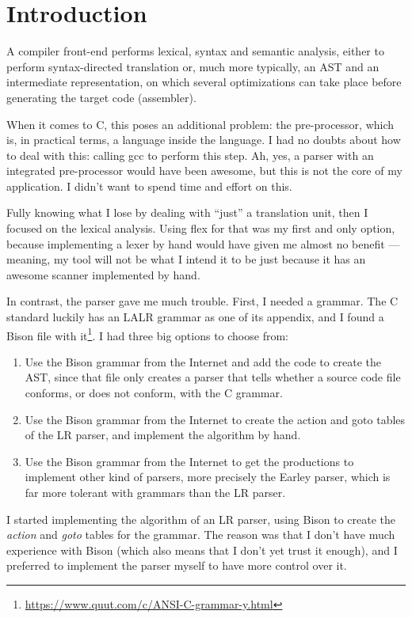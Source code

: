 \documentclass[a4paper,openany]{refrep}
\begin{document}
\section{Introduction}
A compiler front-end performs lexical, syntax and sem\-antic analysis, either to perform syntax-directed translation or, much more typically, an AST and an intermediate representation, on which several optimizations can take place before generating the target code (assembler).

When it comes to C, this poses an additional problem: the pre-processor, which is, in practical terms, a language inside the language. I had no doubts about how to deal with this: calling gcc to perform this step. Ah, yes, a parser with an integrated pre-processor would have been awesome, but this is not the core of my application. I didn't want to spend time and effort on this.

Fully knowing what I lose by dealing with ``just'' a translation unit, then I focused on the lexical analysis. Using flex for that was my first and only option, because implementing a lexer by hand would have given me almost no benefit --- meaning, my tool will not be what I intend it to be just because it has an awesome scanner implemented by hand.

In contrast, the parser gave me much trouble. First, I needed a grammar. The C standard luckily has an LALR grammar as one of its appendix, and I found a Bison file with it\footnote{\url{https://www.quut.com/c/ANSI-C-grammar-y.html}}. I had three big options to choose from:

\begin{enumerate}
\item Use the Bison grammar from the Internet and add the code to create the AST, since that file only creates a parser that tells whether a source code file conforms, or does not conform, with the C grammar.

\item Use the Bison grammar from the Internet to create the action and goto tables of the LR parser, and implement the algorithm by hand.

\item Use the Bison grammar from the Internet to get the productions to im\-ple\-ment other kind of parsers, more precisely the Earley parser, which is far more tolerant with grammars than the LR parser.
\end{enumerate}

I started implementing the algorithm of an LR parser, using Bison to create the \emph{action} and \emph{goto} tables for the grammar. The reason was that I don't have much experience with Bison (which also means that I don't yet trust it enough), and I preferred to implement the parser myself to have more control over it.
\end{document}
